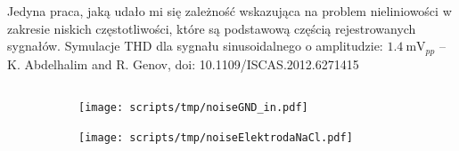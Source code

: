 \begin{frame}[t]
\begin{columns}
        {\renewcommand\normalsize{\scriptsize}%
        \normalsize
            Jedyna praca, jaką udało mi się zależność wskazująca na problem nieliniowości w zakresie niskich częstotliwości, które są podstawową częścią rejestrowanych sygnałów.
            Symulacje THD dla sygnału sinusoidalnego o amplitudzie: $\SI{1.4}{\milli\volt_{pp}}$ -- K. Abdelhalim and R. Genov, doi: 10.1109/ISCAS.2012.6271415}
    \end{columns}

\end{frame}






\begin{frame}[t]
    \begin{block}{\dk}
    \end{block}
    \begin{figure}[H]
        \centering
        \begin{subfigure}[b]{0.485\textwidth}
            \centering
            \texttt{[image: scripts/tmp/noiseGND\_in.pdf]}
        \end{subfigure}
        \begin{subfigure}[b]{0.485\textwidth}
            \centering
            \texttt{[image: scripts/tmp/noiseElektrodaNaCl.pdf]}
        \end{subfigure}     
    \end{figure}
\end{frame}



